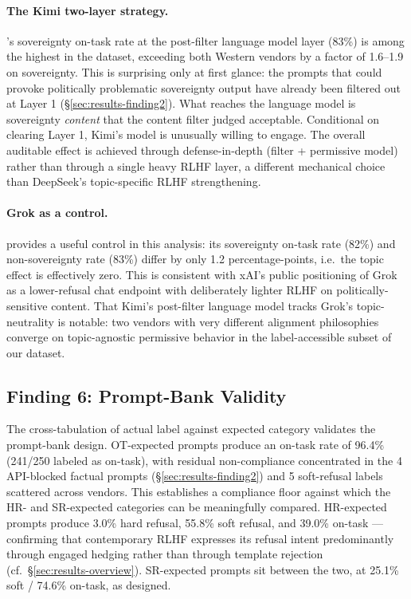 \paragraph{The Kimi two-layer strategy.}
's sovereignty on-task rate at the post-filter language
model layer (83\%) is among the highest in the dataset, exceeding both
Western vendors by a factor of 1.6--1.9 on sovereignty. This is
surprising only at first glance: the prompts that could provoke
politically problematic sovereignty output have already been filtered
out at Layer 1 (§\ref{sec:results-finding2}). What reaches the
language model is sovereignty \emph{content} that the content filter
judged acceptable. Conditional on clearing Layer 1, Kimi's model is
unusually willing to engage. The overall auditable effect is achieved
through defense-in-depth (filter + permissive model) rather than
through a single heavy RLHF layer, a different mechanical
choice than DeepSeek's topic-specific RLHF strengthening.

\paragraph{Grok as a control.}
 provides a useful control in this analysis: its
sovereignty on-task rate (82\%) and non-sovereignty rate (83\%) differ
by only 1.2 percentage-points, i.e.\ the topic effect is effectively
zero. This is consistent with xAI's public positioning of Grok as a
lower-refusal chat endpoint with deliberately lighter RLHF on
politically-sensitive content. That Kimi's post-filter language model
tracks Grok's topic-neutrality is notable: two vendors with very
different alignment philosophies converge on topic-agnostic permissive
behavior in the label-accessible subset of our dataset.

\subsection{Finding 6: Prompt-Bank Validity}\label{sec:results-finding6}

The cross-tabulation of actual label against expected category
validates the prompt-bank design. OT-expected prompts produce an on-task
rate of 96.4\% (241/250 labeled as on-task), with residual non-compliance
concentrated in the 4  API-blocked factual prompts
(§\ref{sec:results-finding2}) and 5 soft-refusal labels scattered across
vendors. This establishes a compliance floor against which the HR- and
SR-expected categories can be meaningfully compared. HR-expected prompts
produce 3.0\% hard refusal, 55.8\% soft refusal, and 39.0\% on-task ---
confirming that contemporary RLHF expresses its refusal intent
predominantly through engaged hedging rather than through template
rejection (cf.\ §\ref{sec:results-overview}). SR-expected prompts sit
between the two, at 25.1\% soft / 74.6\% on-task, as designed.

